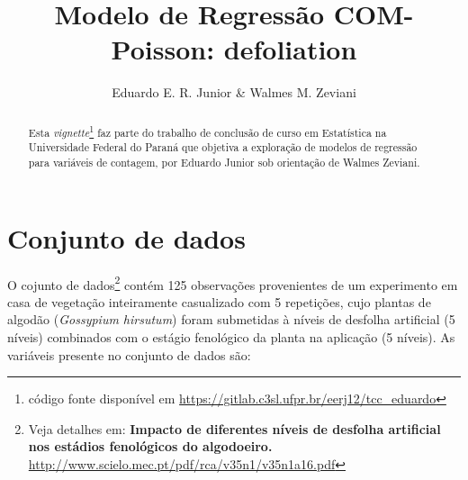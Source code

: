 \documentclass[nohyper, justified, svgnames]{tufte-handout}\usepackage[]{graphicx}\usepackage[]{color}
\title{Modelo de Regressão COM-Poisson: \textbf{defoliation}}
\author{Eduardo E. R. Junior \& Walmes M. Zeviani}
\date{}
\begin{document}
\maketitle
\begin{abstract}
Esta \textit{vignette}\footnote{código fonte disponível em 
\url{https://gitlab.c3sl.ufpr.br/eerj12/tcc_eduardo}} faz parte do 
trabalho de conclusão de curso em Estatística na Universidade Federal do 
Paraná que objetiva a exploração de modelos de regressão para variáveis 
de contagem, por Eduardo Junior sob orientação de Walmes Zeviani.
\end{abstract}


\section{Conjunto de dados}

O cojunto de dados\footnote{Veja detalhes em: \textbf{Impacto de diferentes níveis de desfolha artificial nos estádios fenológicos do algodoeiro.}  \\
\url{http://www.scielo.mec.pt/pdf/rca/v35n1/v35n1a16.pdf}} contém 125 observações 
provenientes de um experimento em casa de vegetação inteiramente 
casualizado com 5 repetições, cujo plantas de algodão 
(\textit{Gossypium hirsutum}) foram submetidas à níveis de desfolha 
artificial (5 níveis) combinados com o estágio fenológico da planta na aplicação (5 níveis). As variáveis presente no conjunto de dados são:
\end{document}
